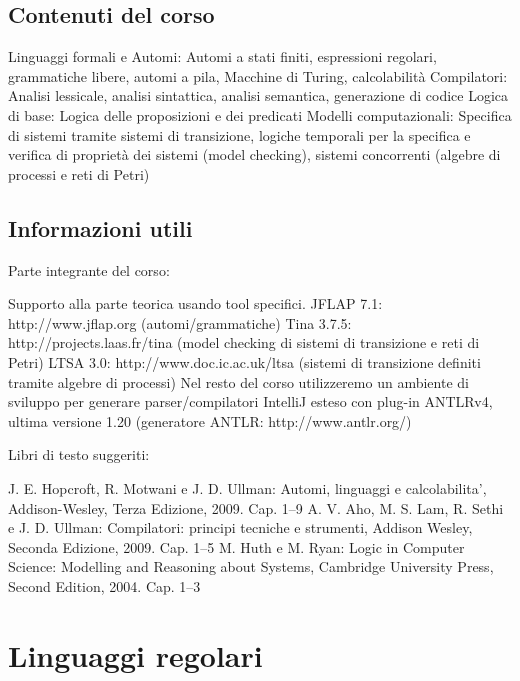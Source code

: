 \documentclass[12pt]{article}
\begin{document}
\subsection{Contenuti del corso}
\begin{outline}
  \1 Linguaggi formali e Automi:
    \2 Automi a stati finiti, espressioni regolari, grammatiche libere, automi a pila, Macchine di Turing, calcolabilità
  \1 Compilatori:
    \2 Analisi lessicale, analisi sintattica, analisi semantica, generazione di codice
  \1 Logica di base:
    \2 Logica delle proposizioni e dei predicati
  \1 Modelli computazionali:
    \2 Specifica di sistemi tramite sistemi di transizione, logiche temporali per la specifica e verifica di proprietà dei sistemi (model checking), sistemi concorrenti (algebre di processi e reti di Petri)
\end{outline}

\subsection{Informazioni utili}
Parte integrante del corso:
\begin{outline}
  \1 Supporto alla parte teorica usando tool specifici.
  \2 JFLAP 7.1: http://www.jflap.org (automi/grammatiche)
  \2 Tina 3.7.5: http://projects.laas.fr/tina
  (model checking di sistemi di transizione e reti di Petri)
  \2 LTSA 3.0: http://www.doc.ic.ac.uk/ltsa
  (sistemi di transizione definiti tramite algebre di processi)
  \1 Nel resto del corso utilizzeremo un ambiente di sviluppo per
  generare parser/compilatori
  \2 IntelliJ esteso con plug-in ANTLRv4, ultima versione 1.20
  (generatore ANTLR: http://www.antlr.org/)
\end{outline}

\newpage
Libri di testo suggeriti:
\begin{outline}
 \1 J. E. Hopcroft, R. Motwani e J. D. Ullman:
Automi, linguaggi e calcolabilita’,
Addison-Wesley, Terza Edizione, 2009. Cap. 1–9
\1 A. V. Aho, M. S. Lam, R. Sethi e J. D. Ullman:
Compilatori: principi tecniche e strumenti,
Addison Wesley, Seconda Edizione, 2009. Cap. 1–5
\1 M. Huth e M. Ryan:
Logic in Computer Science: Modelling and Reasoning about
Systems,
Cambridge University Press, Second Edition, 2004. Cap. 1–3 
\end{outline}

\section{Linguaggi regolari}
\end{document}
